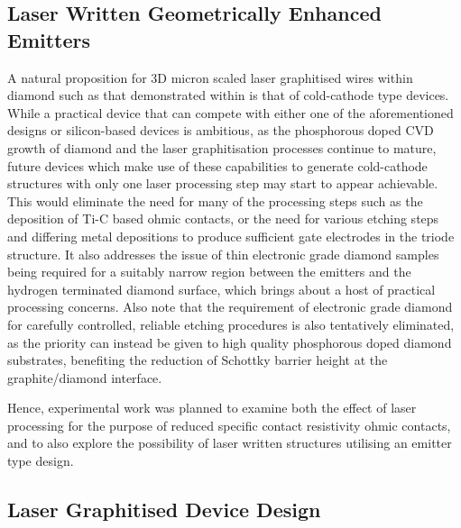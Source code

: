 \begin{refsection}
\subsection{Laser Written Geometrically Enhanced Emitters}
A natural proposition for 3D micron scaled laser graphitised wires within diamond such as that demonstrated within \cite{sun2014} is that of cold-cathode type devices. While a practical device that can compete with either one of the aforementioned designs or silicon-based devices is ambitious, as the phosphorous doped CVD growth of diamond and the laser graphitisation processes continue to mature, future devices which make use of these capabilities to generate cold-cathode structures with only one laser processing step may start to appear achievable. This would eliminate the need for many of the processing steps such as the deposition of Ti-C based ohmic contacts, or the need for various etching steps and differing metal depositions to produce sufficient gate electrodes in the triode structure. It also addresses the issue of thin electronic grade diamond samples being required for a suitably narrow region between the emitters and the hydrogen terminated diamond surface, which brings about a host of practical processing concerns. Also note that the requirement of electronic grade diamond for carefully controlled, reliable etching procedures is also tentatively eliminated, as the priority can instead be given to high quality phosphorous doped diamond substrates, benefiting the reduction of Schottky barrier height at the graphite/diamond interface.

Hence, experimental work was planned to examine both the effect of laser processing for the purpose of reduced specific contact resistivity ohmic contacts, and to also explore the possibility of laser written structures utilising an emitter type design.

\subsection{Laser Graphitised Device Design}


\end{refsection}
